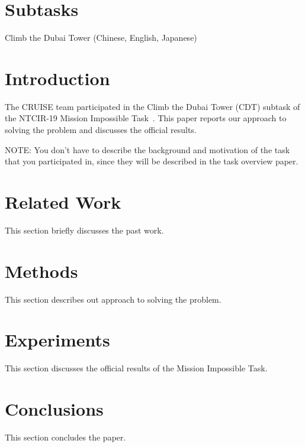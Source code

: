 \documentclass[sigconf,article]{acmart}
\begin{document}
\section*{Subtasks}

Climb the Dubai Tower (Chinese, English, Japanese)

\section{Introduction}
The CRUISE team participated in the Climb the Dubai Tower (CDT) subtask of the NTCIR-19 Mission Impossible Task~\cite{mioverview}. This paper reports our approach to solving the problem and discusses the official results.

NOTE: You don't have to describe the background and motivation of the task that you participated in, since they will be described in the task overview paper.

\section{Related Work}
This section briefly discusses the past work.

\section{Methods}
This section describes out approach to solving the problem.

\section{Experiments}
This section discusses the official results of the Mission Impossible Task.


\section{Conclusions}
This section concludes the paper.





\end{document}
